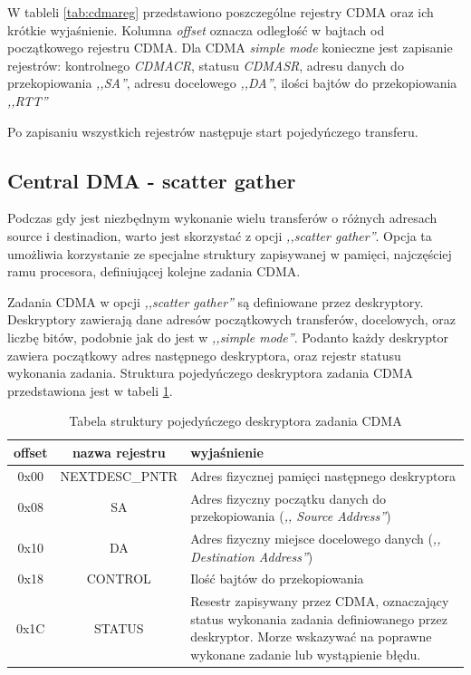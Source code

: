 W tableli \ref{tab:cdmareg} przedstawiono poszczególne rejestry CDMA oraz ich krótkie
wyjaśnienie. Kolumna \textit{offset} oznacza odległość w bajtach od początkowego rejestru
CDMA. Dla CDMA \textit{simple mode} konieczne jest zapisanie rejestrów: kontrolnego
\textit{CDMACR}, statusu \textit{CDMASR}, adresu danych do przekopiowania \textit{,,SA''},
adresu docelowego \textit{,,DA''}, ilości bajtów do przekopiowania \textit{,,RTT''}

Po zapisaniu wszystkich rejestrów następuje start pojedyńczego transferu.

\subsection{Central DMA - scatter gather}
\label{sec:logika::dma:sg}

Podczas gdy jest niezbędnym wykonanie wielu transferów o różnych adresach
source i destinadion, warto jest skorzystać z opcji \textit{,,scatter gather''}.
Opcja ta umożliwia korzystanie ze specjalne struktury zapisywanej w pamięci,
najczęściej ramu procesora,
definiującej kolejne zadania CDMA.

Zadania CDMA w opcji \textit{,,scatter gather''} są definiowane przez deskryptory.
Deskryptory zawierają dane adresów początkowych transferów, docelowych, oraz liczbę bitów,
podobnie jak do jest w \textit{,,simple mode''}.
Podanto każdy deskryptor zawiera początkowy adres następnego deskryptora, oraz
rejestr statusu wykonania zadania. Struktura pojedyńczego deskryptora
zadania CDMA przedstawiona jest w tabeli \ref{tab:cdmadesc}.

\begin{table}[h]
    \begin{center}
    \label{tab:cdmadesc}
    \caption{Tabela struktury pojedyńczego deskryptora zadania CDMA}
    \begin{tabularx}{\textwidth}{|c|c|X|}
        \hline
        offset & nazwa rejestru & wyjaśnienie \\ \hline \hline
        0x00 & NEXTDESC\_PNTR & Adres fizycznej pamięci następnego deskryptora \\ \hline
        0x08 & SA & Adres fizyczny początku danych do przekopiowania (\textit{,, Source Address''}) \\ \hline
        0x10 & DA & Adres fizyczny miejsce docelowego danych (\textit{,, Destination Address''}) \\ \hline
        0x18 & CONTROL & Ilość bajtów do przekopiowania \\ \hline
        0x1C & STATUS & Resestr zapisywany przez CDMA, oznaczający status wykonania zadania
                        definiowanego przez deskryptor. Morze wskazywać na poprawne wykonane
                        zadanie lub wystąpienie błędu. \\ \hline
    \end{tabularx}
    \end{center}
\end{table}


